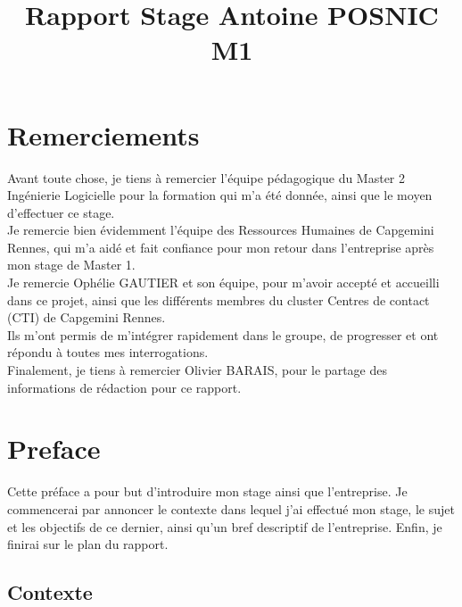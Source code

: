 \documentclass{rapport}
\title{Rapport Stage Antoine POSNIC M1} %
\begin{document}






\fairemarges %
\fairepagedegarde %
\afterpage{\null\newpage}
\tabledematieres %

\section*{Remerciements}
Avant toute chose, je tiens à remercier l'équipe pédagogique du Master 2 Ingénierie Logicielle pour la formation qui m'a été donnée, ainsi que le moyen d'effectuer ce stage.\\
Je remercie bien évidemment l'équipe des Ressources Humaines de Capgemini Rennes, qui m'a aidé et fait confiance pour mon retour dans l'entreprise après mon stage de Master 1.\\
Je remercie Ophélie GAUTIER et son équipe, pour m'avoir accepté et accueilli dans ce projet, ainsi que les différents membres du cluster Centres de contact (CTI) de Capgemini Rennes.\\
Ils m'ont permis de m'intégrer rapidement dans le groupe, de progresser et ont répondu à toutes mes interrogations.\\
Finalement, je tiens à remercier Olivier BARAIS, pour le partage des informations de rédaction pour ce rapport.

\newpage
\section*{Preface}
Cette préface a pour but d'introduire mon stage ainsi que l'entreprise. Je commencerai par annoncer le contexte dans lequel j'ai effectué mon stage, le sujet et les objectifs de ce dernier, ainsi qu'un bref descriptif de l'entreprise. Enfin, je finirai sur le plan du rapport.

\subsection*{Contexte}
\end{document}
